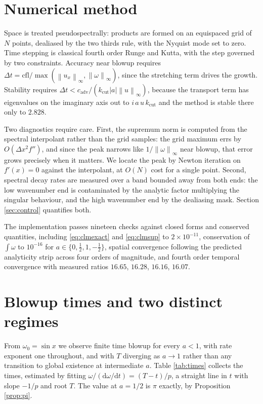 \documentclass[11pt]{article}
\theoremstyle{definition}
\newcommand{\norm}[1]{\left\lVert #1 \right\rVert}
\newcommand{\abs}[1]{\left\lvert #1 \right\rvert}
\begin{document}
\section{Numerical method}

Space is treated pseudospectrally: products are formed on an equispaced grid of
$N$ points, dealiased by the two thirds rule, with the Nyquist mode set to
zero. Time stepping is classical fourth order Runge and Kutta, with the step
governed by two constraints. Accuracy near blowup requires
$\Delta t = \mathrm{cfl}/\max(\norm{u_x}_\infty,\norm{\omega}_\infty)$, since
the stretching term drives the growth. Stability requires
$\Delta t < c_{\mathrm{adv}}/(k_{\mathrm{cut}}\abs{a}\norm{u}_\infty)$, because
the transport term has eigenvalues on the imaginary axis out to
$i\,a\,u\,k_{\mathrm{cut}}$ and the method is stable there only to $2.828$.

Two diagnostics require care. First, the supremum norm is computed from the
spectral interpolant rather than the grid samples: the grid maximum errs by
$O(\Delta x^2 f'')$, and since the peak narrows like $1/\norm{\omega}_\infty$
near blowup, that error grows precisely when it matters. We locate the peak by
Newton iteration on $f'(x)=0$ against the interpolant, at $O(N)$ cost for a
single point. Second, spectral decay rates are measured over a band bounded
away from both ends: the low wavenumber end is contaminated by the analytic
factor multiplying the singular behaviour, and the high wavenumber end by the
dealiasing mask. Section \ref{sec:control} quantifies both.

The implementation passes nineteen checks against closed forms and conserved
quantities, including \eqref{eq:clmexact} and \eqref{eq:clmsup} to
$2\times 10^{-11}$, conservation of $\int\omega$ to $10^{-16}$ for
$a\in\{0,\tfrac12,1,-\tfrac12\}$, spatial convergence following the predicted
analyticity strip across four orders of magnitude, and fourth order temporal
convergence with measured ratios $16.65$, $16.28$, $16.16$, $16.07$.

\section{Blowup times and two distinct regimes}
\label{sec:regimes}

From $\omega_0 = \sin x$ we observe finite time blowup for every $a<1$, with
rate exponent one throughout, and with $T$ diverging as $a\to1$ rather than any
transition to global existence at intermediate $a$. Table \ref{tab:times}
collects the times, estimated by fitting
$\omega/(\mathrm{d}\omega/\mathrm{d}t) = (T-t)/p$, a straight line in $t$ with
slope $-1/p$ and root $T$. The value at $a=1/2$ is $\pi$ exactly, by
Proposition \ref{prop:pi}.
\end{document}
